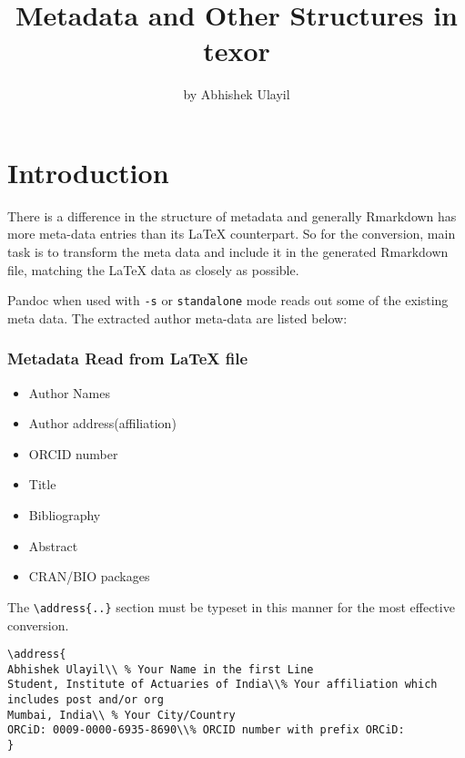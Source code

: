 \title{Metadata and Other Structures in texor}
\author{by Abhishek Ulayil}

\maketitle


\section{Introduction}
There is a difference in the structure of metadata and generally Rmarkdown has more
meta-data entries than its LaTeX counterpart. So for the conversion, main task is to 
transform the meta data and include it in the generated Rmarkdown file, matching the
LaTeX data as closely as possible.

Pandoc when used with \verb|-s| or \verb|standalone| mode reads out some of the existing
meta data. The extracted author meta-data are listed below:


\subsubsection{Metadata Read from LaTeX file}

\begin{itemize}
  \item Author Names 
  \item Author address(affiliation)
  \item ORCID number
  \item Title
  \item Bibliography
  \item Abstract
  \item CRAN/BIO packages
\end{itemize}

The \verb|\address{..}| section must be typeset in this manner for the most 
effective conversion.
\begin{verbatim}
\address{
Abhishek Ulayil\\ % Your Name in the first Line
Student, Institute of Actuaries of India\\% Your affiliation which includes post and/or org
Mumbai, India\\ % Your City/Country
ORCiD: 0009-0000-6935-8690\\% ORCID number with prefix ORCiD: 
}
\end{verbatim}

